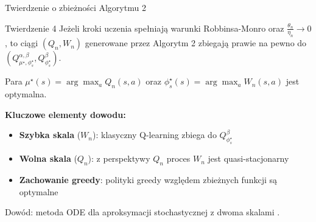 \begin{frame}{Twierdzenie o zbieżności Algorytmu 2}
\begin{block}{Twierdzenie 4 \cite{eshwar2025}}
Jeżeli kroki uczenia spełniają warunki Robbinsa-Monro oraz $\frac{\theta_n}{\eta_n} \to 0$, to ciągi $(Q_n, W_n)$ generowane przez Algorytm 2 zbiegają prawie na pewno do $(Q^{\alpha, \beta}_{\mu^\star, \phi_s^\star}, Q^{\beta}_{\phi_s^\star})$.

Para $\mu^\star(s) = \arg\max_a Q_n(s,a)$ oraz $\phi_s^\star(s) = \arg\max_a W_n(s,a)$ jest optymalna.
\end{block}

\vspace{0.5em}
\textbf{Kluczowe elementy dowodu:}
\begin{itemize}
    \item \textbf{Szybka skala} ($W_n$): klasyczny Q-learning zbiega do $Q^{\beta}_{\phi_s^\star}$
    \item \textbf{Wolna skala} ($Q_n$): z perspektywy $Q_n$ proces $W_n$ jest quasi-stacjonarny
    \item \textbf{Zachowanie greedy}: polityki greedy względem zbieżnych funkcji są optymalne
\end{itemize}

{\small Dowód: metoda ODE dla aproksymacji stochastycznej z dwoma skalami \cite{borkar2008}.}
\end{frame}
